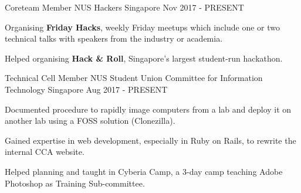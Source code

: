 

\begin{cventries}

 \cventry
    {Coreteam Member} %
    {NUS Hackers} %
    {Singapore} %
    {Nov 2017 - PRESENT} %
    {
      \begin{cvitems} %
      	\item {Organising \textbf{Friday Hacks}, weekly Friday meetups which include one or two technical talks with speakers from the industry or academia.}
      	\item {Helped organising \textbf{Hack \& Roll}, Singapore's largest student-run hackathon.}
      \end{cvitems}
    }
    
  \cventry
    {Technical Cell Member} %
    {NUS Student Union Committee for Information Technology} %
    {Singapore} %
    {Aug 2017 - PRESENT} %
    {
      \begin{cvitems} %
      	\item {Documented procedure to rapidly image computers from a lab and deploy it on another lab using a FOSS solution (Clonezilla).}
        \item {Gained expertise in web development, especially in Ruby on Rails, to rewrite the internal CCA website.}
        \item {Helped planning and taught in Cyberia Camp, a 3-day camp teaching Adobe Photoshop as Training Sub-committee.}
      \end{cvitems}
    }
    
\end{cventries}
